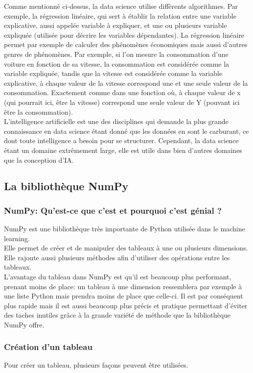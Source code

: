 \documentclass[a4paper, 12pt]{article}
\numberwithin{equation}{subsection}
\begin{document}
Comme mentionné ci-dessus, la data science utilise diffèrents algorithmes. Par exemple, la régression linéaire, qui sert à établir la relation entre une variable explicative, aussi appelée variable à expliquer, et une ou plusieurs variable expliquée (utilisée pour décrire les variables dépendantes). La régression linéaire permet par exemple de calculer des phénomènes économiques mais aussi d'autres genres de phénomènes. Par exemple, si l'on mesure la consommation d'une voiture en fonction de sa vitesse, la consommation est considérée comme la variable expliquée, tandis que la vitesse est considérée comme la variable explicative, à chaque valeur de la vitesse correspond une et une seule valeur de la consommation. Exactement comme dans une fonction où, à chaque valeur de x (qui pourrait ici, être la vitesse) correspond une seule valeur de Y (pouvant ici être la consommation).\\

L'intelligence artificielle est une des disciplines qui demande la plus grande connaissance en data science étant donné que les données en sont le carburant, ce dont toute intelligence a besoin pour se structurer. Cependant, la data science étant un domaine extrêmement large, elle est utile dans bien d'autres domaines que la conception d'IA.
\subsection{La bibliothèque NumPy}
\subsubsection{NumPy: Qu'est-ce que c'est et pourquoi c'est génial ?}
NumPy est une bibliothèque très importante de Python utilisée dans le machine learning. \\

Elle permet de créer et de manipuler des tableaux à une ou plusieurs dimensions. Elle rajoute aussi plusieurs méthodes afin d'utiliser des opérations entre les tableaux. \\

L'avantage du tableau dans NumPy est qu’il est beaucoup plus performant, prenant moins de place: un tableau à une dimension ressemblera par exemple à une liste Python mais prendra moins de place que celle-ci. Il est par conséquent plus rapide mais il est aussi beaucoup plus précis et pratique permettant d’éviter des taches inutiles grâce à la grande variété de méthode que la bibliothèque NumPy offre.
\subsubsection{Création d'un tableau}
Pour créer un tableau, plusieurs façons peuvent être utilisées. \\
\end{document}

